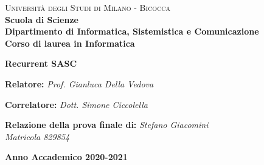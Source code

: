 \documentclass{report}
\begin{document}
\captionsetup[table]{name=Figura}

\begin{titlepage}


  \noindent
  \begin{minipage}[t]{0.19\textwidth}
  \end{minipage}
  \begin{minipage}[t]{0.81\textwidth}
    {
      {\textsc{Università degli Studi di Milano - Bicocca}}\\
      \textbf{Scuola di Scienze}\\
      \textbf{Dipartimento di Informatica, Sistemistica e Comunicazione}\\
      \textbf{Corso di laurea in Informatica}\\
      \par
    }
  \end{minipage}

  \vspace{40mm}

  \begin{center}
    {\LARGE{
        \textbf{Recurrent SASC}}}
  \end{center}

  \vspace{50mm}

  \noindent
  {\large \textbf{Relatore:} \textit{Prof. Gianluca Della Vedova} }

  \noindent
  {\large \textbf{Correlatore:} \textit{Dott. Simone Ciccolella}}

  \vspace{15mm}

  \begin{flushright}
    \textbf{\large Relazione della prova finale di:}
    \large{\textit{Stefano Giacomini}}\\
    \large{\textit{Matricola 829854}}
  \end{flushright}

  \vspace{40mm}
  \begin{center}
    {\large{\bf Anno Accademico 2020-2021}}
  \end{center}

  \restoregeometry

\end{titlepage}
\restoregeometry
\end{document}
